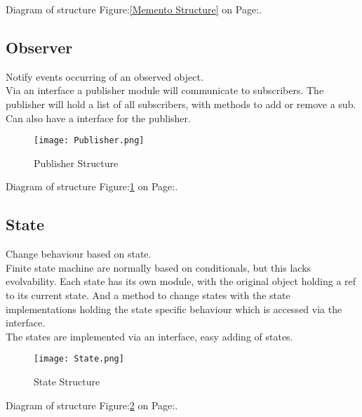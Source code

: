 \documentclass[11pt]{scrartcl} %
\begin{document}
Diagram of structure Figure:\ref{Memento Structure} on Page:\pageref{Memento Structure}.

\subsection{Observer}

Notify events occurring of an observed object.\\

Via an interface a publisher module will communicate to subscribers. The publisher will hold a list of all subscribers,
with methods to add or remove a sub. Can also have a interface for the publisher.\\

\begin{figure}[h] %
	\centering
	\texttt{[image: Publisher.png]} %
	\caption{Publisher Structure}
	\label{Publisher Structure}
\end{figure}

Diagram of structure Figure:\ref{Publisher Structure} on Page:\pageref{Publisher Structure}.

\subsection{State}

Change behaviour based on state.\\

Finite state machine are normally based on conditionals, but this lacks evolvability. Each state has its own module,
with the original object holding a ref to its current state. And a method to change states with the state
implementations holding the state specific behaviour which is accessed via the interface. \\

The states are implemented via an interface, easy adding of states.\\

\begin{figure}[h] %
	\centering
	\texttt{[image: State.png]} %
	\caption{State Structure}
	\label{State Structure}
\end{figure}

Diagram of structure Figure:\ref{State Structure} on Page:\pageref{State Structure}.
\end{document}
